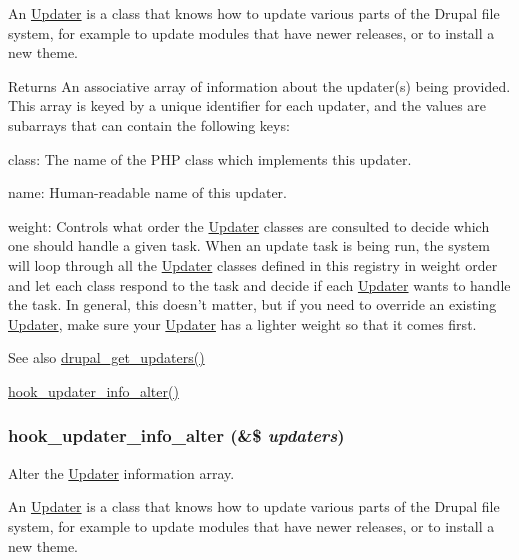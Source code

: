 An \hyperlink{classUpdater}{Updater} is a class that knows how to update various parts of the Drupal file system, for example to update modules that have newer releases, or to install a new theme.

\begin{DoxyReturn}{Returns}
An associative array of information about the updater(s) being provided. This array is keyed by a unique identifier for each updater, and the values are subarrays that can contain the following keys:
\begin{DoxyItemize}
\item class: The name of the PHP class which implements this updater.
\item name: Human-\/readable name of this updater.
\item weight: Controls what order the \hyperlink{classUpdater}{Updater} classes are consulted to decide which one should handle a given task. When an update task is being run, the system will loop through all the \hyperlink{classUpdater}{Updater} classes defined in this registry in weight order and let each class respond to the task and decide if each \hyperlink{classUpdater}{Updater} wants to handle the task. In general, this doesn't matter, but if you need to override an existing \hyperlink{classUpdater}{Updater}, make sure your \hyperlink{classUpdater}{Updater} has a lighter weight so that it comes first.
\end{DoxyItemize}
\end{DoxyReturn}
\begin{DoxySeeAlso}{See also}
\hyperlink{common_8inc_a0fa53aa7b4cdefaccb5283da37ad75df}{drupal\_\-get\_\-updaters()} 

\hyperlink{group__hooks_gaf697fc432c34c994712849afa70c1b89}{hook\_\-updater\_\-info\_\-alter()} 
\end{DoxySeeAlso}
\hypertarget{group__hooks_gaf697fc432c34c994712849afa70c1b89}{
\subsubsection[{hook\_\-updater\_\-info\_\-alter}]{\setlength{\rightskip}{0pt plus 5cm}hook\_\-updater\_\-info\_\-alter (\&\$ {\em updaters})}}
\label{group__hooks_gaf697fc432c34c994712849afa70c1b89}
Alter the \hyperlink{classUpdater}{Updater} information array.

An \hyperlink{classUpdater}{Updater} is a class that knows how to update various parts of the Drupal file system, for example to update modules that have newer releases, or to install a new theme.


